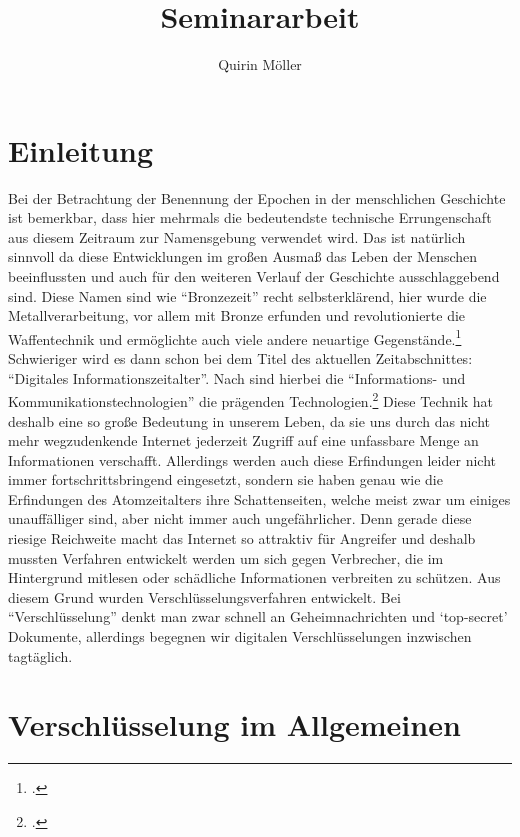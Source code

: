 \documentclass{scrarticle} %
\title{Seminararbeit}
\author{Quirin Möller}
\begin{document}
    
    \maketitle
    \newpage
    \tableofcontents
    \newpage

    \section{Einleitung}
    Bei der Betrachtung der Benennung der Epochen in der menschlichen Geschichte ist bemerkbar, dass hier mehrmals die bedeutendste technische Errungenschaft aus diesem Zeitraum zur Namensgebung verwendet wird. Das ist natürlich sinnvoll da diese Entwicklungen im großen Ausmaß das Leben der Menschen beeinflussten und auch für den weiteren Verlauf der Geschichte ausschlaggebend sind. Diese Namen sind  wie \enquote{Bronzezeit} recht selbsterklärend, hier wurde die Metallverarbeitung, vor allem mit Bronze erfunden und revolutionierte die Waffentechnik und ermöglichte auch viele andere neuartige Gegenstände.\footcite{BronzezeitEuropaDeutschland} 
    Schwieriger wird es dann schon bei dem Titel des aktuellen Zeitabschnittes: \enquote{Digitales Informationszeitalter}. Nach  sind hierbei die \enquote{Informations- und Kommunikationstechnologien} die prägenden Technologien.\footcite{jornlengsfeld}
    Diese Technik hat deshalb eine so große Bedeutung in unserem Leben, da sie uns durch das nicht mehr wegzudenkende Internet jederzeit Zugriff auf eine unfassbare Menge an Informationen verschafft. Allerdings werden auch diese Erfindungen leider nicht immer fortschrittsbringend eingesetzt, sondern sie haben genau wie die Erfindungen des Atomzeitalters ihre Schattenseiten, welche meist zwar um einiges unauffälliger sind, aber nicht immer auch ungefährlicher. Denn gerade diese riesige Reichweite macht das Internet so attraktiv für Angreifer und deshalb mussten Verfahren entwickelt werden um sich gegen Verbrecher, die im Hintergrund mitlesen oder schädliche Informationen verbreiten zu schützen. Aus diesem Grund wurden Verschlüsselungsverfahren entwickelt. Bei \enquote{Verschlüsselung} denkt man zwar schnell an Geheimnachrichten und \enquote*{top-secret} Dokumente, allerdings begegnen wir digitalen Verschlüsselungen inzwischen tagtäglich.

    \section[Verschlüsselung allgemein]{Verschlüsselung im Allgemeinen}
\end{document}

